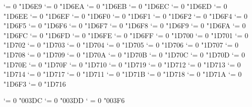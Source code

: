 \Umathcode `\Θ = 0 \unimathfam "1D6E9
\Umathcode `\Ι = 0 \unimathfam "1D6EA
\Umathcode `\Κ = 0 \unimathfam "1D6EB
\Umathcode `\Λ = 0 \unimathfam "1D6EC
\Umathcode `\Μ = 0 \unimathfam "1D6ED
\Umathcode `\Ν = 0 \unimathfam "1D6EE
\Umathcode `\Ξ = 0 \unimathfam "1D6EF
\Umathcode `\Ο = 0 \unimathfam "1D6F0
\Umathcode `\Π = 0 \unimathfam "1D6F1
\Umathcode `\Ρ = 0 \unimathfam "1D6F2
\Umathcode `\Σ = 0 \unimathfam "1D6F4
\Umathcode `\Τ = 0 \unimathfam "1D6F5
\Umathcode `\Υ = 0 \unimathfam "1D6F6
\Umathcode `\Φ = 0 \unimathfam "1D6F7
\Umathcode `\Χ = 0 \unimathfam "1D6F8
\Umathcode `\Ψ = 0 \unimathfam "1D6F9
\Umathcode `\Ω = 0 \unimathfam "1D6FA
\Umathcode `\α = 0 \unimathfam "1D6FC
\Umathcode `\β = 0 \unimathfam "1D6FD
\Umathcode `\γ = 0 \unimathfam "1D6FE
\Umathcode `\δ = 0 \unimathfam "1D6FF
\Umathcode `\ε = 0 \unimathfam "1D700
\Umathcode `\ζ = 0 \unimathfam "1D701
\Umathcode `\η = 0 \unimathfam "1D702
\Umathcode `\θ = 0 \unimathfam "1D703
\Umathcode `\ι = 0 \unimathfam "1D704
\Umathcode `\κ = 0 \unimathfam "1D705
\Umathcode `\λ = 0 \unimathfam "1D706
\Umathcode `\μ = 0 \unimathfam "1D707
\Umathcode `\ν = 0 \unimathfam "1D708
\Umathcode `\ξ = 0 \unimathfam "1D709
\Umathcode `\ο = 0 \unimathfam "1D70A
\Umathcode `\π = 0 \unimathfam "1D70B
\Umathcode `\ρ = 0 \unimathfam "1D70C
\Umathcode `\ς = 0 \unimathfam "1D70D
\Umathcode `\σ = 0 \unimathfam "1D70E
\Umathcode `\τ = 0 \unimathfam "1D70F
\Umathcode `\υ = 0 \unimathfam "1D710
\Umathcode `\φ = 0 \unimathfam "1D719
\Umathcode `\χ = 0 \unimathfam "1D712
\Umathcode `\ψ = 0 \unimathfam "1D713
\Umathcode `\ω = 0 \unimathfam "1D714
\Umathcode `\ϑ = 0 \unimathfam "1D717
\Umathcode `\ϕ = 0 \unimathfam "1D711
\Umathcode `\ϖ = 0 \unimathfam "1D71B
\Umathcode `\ϰ = 0 \unimathfam "1D718
\Umathcode `\ϱ = 0 \unimathfam "1D71A
\Umathcode `\ϴ = 0 \unimathfam "1D6F3
\Umathcode `\ϵ = 0 \unimathfam "1D716

\Umathcode `\Ϝ = 0 \unimathfam "003DC
\Umathcode `\ϝ = 0 \unimathfam "003DD
\Umathcode `\϶ = 0 \unimathfam "003F6



\let\Alpha=Α      \let\Beta=Β     \let\Gamma=Γ    \let\Delta=Δ
\let\Epsilon=Ε    \let\Zeta=Ζ     \let\Eta=Η      \let\Theta=Θ
\let\Iota=Ι       \let\Kappa=Κ    \let\Lambda=Λ   \let\Mu=Μ
\let\Nu=Ν         \let\Xi=Ξ       \let\Omicron=Ο  \let\Pi=Π
\let\Rho=Ρ        \let\Sigma=Σ    \let\Tau=Τ      \let\Upsilon=Υ
\let\Phi=Φ        \let\Chi=Χ      \let\Psi=Ψ      \let\Omega=Ω
\let\alpha=α      \let\beta=β     \let\gamma=γ    \let\delta=δ
\let\varepsilon=ε \let\zeta=ζ     \let\eta=η      \let\theta=θ
\let\iota=ι       \let\kappa=κ    \let\lambda=λ   \let\mu=μ
\let\nu=ν         \let\xi=ξ       \let\omicron=ο  \let\pi=π
\let\rho=ρ        \let\varsigma=ς \let\sigma=σ    \let\tau=τ
\let\upsilon=υ    \let\phi=φ      \let\chi=χ      \let\psi=ψ
\let\omega=ω      \let\vartheta=ϑ \let\varphi=ϕ   \let\varpi=ϖ
\let\varkappa=ϰ   \let\varrho=ϱ   \let\varTheta=ϴ \let\epsilon=ϵ

